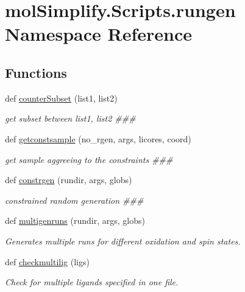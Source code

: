 \hypertarget{namespacemolSimplify_1_1Scripts_1_1rungen}{}\section{mol\+Simplify.\+Scripts.\+rungen Namespace Reference}
\label{namespacemolSimplify_1_1Scripts_1_1rungen}
\subsection*{Functions}
\begin{DoxyCompactItemize}
\item 
def \hyperlink{namespacemolSimplify_1_1Scripts_1_1rungen_af46815168bcc1608e7a0ba3eb472e565}{counter\+Subset} (list1, list2)
\begin{DoxyCompactList}\small\item\em get subset between list1, list2 \#\#\# \end{DoxyCompactList}\item 
def \hyperlink{namespacemolSimplify_1_1Scripts_1_1rungen_a94e0fab8e80bd8616bf1012fe41be550}{getconstsample} (no\+\_\+rgen, args, licores, coord)
\begin{DoxyCompactList}\small\item\em get sample aggreeing to the constraints \#\#\# \end{DoxyCompactList}\item 
def \hyperlink{namespacemolSimplify_1_1Scripts_1_1rungen_a11050086ca9b1adb58378df39d8da2ac}{constrgen} (rundir, args, globs)
\begin{DoxyCompactList}\small\item\em constrained random generation \#\#\# \end{DoxyCompactList}\item 
def \hyperlink{namespacemolSimplify_1_1Scripts_1_1rungen_a79e1969b2072ebcc9ef17c38829d0e18}{multigenruns} (rundir, args, globs)
\begin{DoxyCompactList}\small\item\em Generates multiple runs for different oxidation and spin states. \end{DoxyCompactList}\item 
def \hyperlink{namespacemolSimplify_1_1Scripts_1_1rungen_aeed4f28deecb6df6f25668fe01cb09d5}{checkmultilig} (ligs)
\begin{DoxyCompactList}\small\item\em Check for multiple ligands specified in one file. \end{DoxyCompactList}\item 

\end{DoxyCompactItemize}
